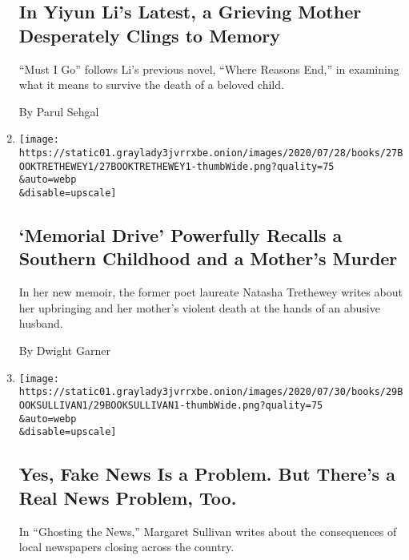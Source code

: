 \begin{enumerate}
  \hypertarget{in-yiyun-lis-latest-a-grieving-mother-desperately-clings-to-memory}{%
  \subsection{In Yiyun Li's Latest, a Grieving Mother Desperately Clings
  to
  Memory}\label{in-yiyun-lis-latest-a-grieving-mother-desperately-clings-to-memory}}

  ``Must I Go'' follows Li's previous novel, ``Where Reasons End,'' in
  examining what it means to survive the death of a beloved child.

  By Parul Sehgal
\item
  \href{/2020/07/27/books/review-memorial-drive-memoir-natasha-trethewey.html}{}

  \texttt{[image: https://static01.graylady3jvrrxbe.onion/images/2020/07/28/books/27BOOKTRETHEWEY1/27BOOKTRETHEWEY1-thumbWide.png?quality=75\\\&auto=webp\\\&disable=upscale]}

  \hypertarget{memorial-drive-powerfully-recalls-a-southern-childhood-and-a-mothers-murder}{%
  \subsection{`Memorial Drive' Powerfully Recalls a Southern Childhood
  and a Mother's
  Murder}\label{memorial-drive-powerfully-recalls-a-southern-childhood-and-a-mothers-murder}}

  In her new memoir, the former poet laureate Natasha Trethewey writes
  about her upbringing and her mother's violent death at the hands of an
  abusive husband.

  By Dwight Garner
\item
  \href{/2020/07/26/books/review-ghosting-news-local-journalism-democracy-crisis-margaret-sullivan.html}{}

  \texttt{[image: https://static01.graylady3jvrrxbe.onion/images/2020/07/30/books/29BOOKSULLIVAN1/29BOOKSULLIVAN1-thumbWide.png?quality=75\\\&auto=webp\\\&disable=upscale]}

  \hypertarget{yes-fake-news-is-a-problem-but-theres-a-real-news-problem-too}{%
  \subsection{Yes, Fake News Is a Problem. But There's a Real News
  Problem,
  Too.}\label{yes-fake-news-is-a-problem-but-theres-a-real-news-problem-too}}

  In ``Ghosting the News,'' Margaret Sullivan writes about the
  consequences of local newspapers closing across the country.


\end{enumerate}
